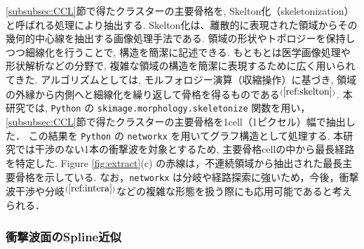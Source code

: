 \documentclass[a4j]{jarticle}
\begin{document}
\ref{subsubsec:CCL}節で得たクラスターの主要骨格を, Skelton化（skeletonization）と呼ばれる処理により抽出する.
Skelton化は、離散的に表現された領域からその幾何的中心線を抽出する画像処理手法である. 
領域の形状やトポロジーを保持しつつ細線化を行うことで, 構造を簡潔に記述できる.
もともとは医学画像処理や形状解析などの分野で, 複雑な領域の構造を簡潔に表現するために広く用いられてきた.
アルゴリズムとしては, モルフォロジー演算（収縮操作）に基づき, 領域の外縁から内側へと細線化を繰り返して骨格を得るものである$^{(\ref{ref:skelton})}$.
本研究では, \texttt{Python} の \texttt{skimage.morphology.skeletonize} 関数を用い，\ref{subsubsec:CCL}節で得たクラスターの主要骨格を1cell（1ピクセル）幅で抽出した．
この結果を \texttt{Python} の \texttt{networkx} を用いてグラフ構造として処理する.
本研究では干渉のない1本の衝撃波を対象とするため, 主要骨格cellの中から最長経路を特定した.
Figure \ref{fig:extract}(c) の赤線は，不連続領域から抽出された最長主要骨格を示している.
なお，\texttt{networkx} は分岐や経路探索に強いため，今後，衝撃波干渉や分岐$^{(\ref{ref:intera})}$などの複雑な形態を扱う際にも応用可能であると考えられる．

\subsubsection{衝撃波面のSpline近似} \label{subsubsec:spline}
\mbox{}\\[-1.0ex]
\end{document}
